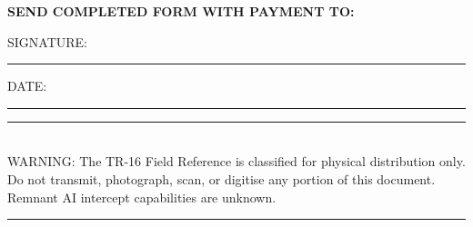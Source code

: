 \documentclass[10pt]{article}
\begin{document}
\vspace{6pt}

{\bfseries SEND COMPLETED FORM WITH PAYMENT TO:}\\[3pt]

\vspace{8pt}

SIGNATURE: \rule{12em}{0.4pt} \hfill DATE: \rule{8em}{0.4pt}

\vspace{8pt}

{\centering\footnotesize
\rule{\textwidth}{0.4pt}\\[2pt]
WARNING: The TR-16 Field Reference is classified for physical
distribution only. Do not transmit, photograph, scan, or
digitise any portion of this document. Remnant AI intercept
capabilities are unknown.\\[2pt]
\rule{\textwidth}{0.4pt}\par}
\end{document}
